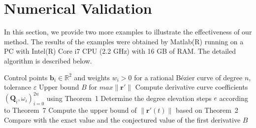\documentclass[preprint,12pt]{elsarticle}
\begin{document}
\label{sec:min_degree}







\section{Numerical Validation}
\label{Numerical Validation}

In this section, we provide two more examples to illustrate the effectiveness of our method. The results of the examples were obtained by Matlab(R) running on a PC with Intel(R) Core i7 CPU (2.2 GHz) with 16 GB of RAM. The detailed algorithm is described below.
\begin{algorithm}[H]
\caption{Algorithm for estimating the derivative bound of a rational Bézier curve}
\label{alg:derivative_bound}
\begin{algorithmic}[1]
\Require Control points $\mathbf{b}_i \in \mathbb{R}^2$ and weights $w_i>0$ for a rational Bézier curve of degree $n$, tolerance $\varepsilon$
\Ensure Upper bound $B$ for $max\|\mathbf{r}'\|$
\State Compute derivative curve coefficients $(\mathbf{Q}_i, \omega_i)_{i=0}^{2n}$ using Theorem~1
\State Determine the degree elevation steps $e$ according to Theorem~7
\State Compute the upper bound of $\|\mathbf{r}'(t)\|$ based on Theorem~2
\State Compare with the exact value and the conjectured value of the first derivative
\State \Return $B$
\end{algorithmic}
\end{algorithm}
\end{document}

